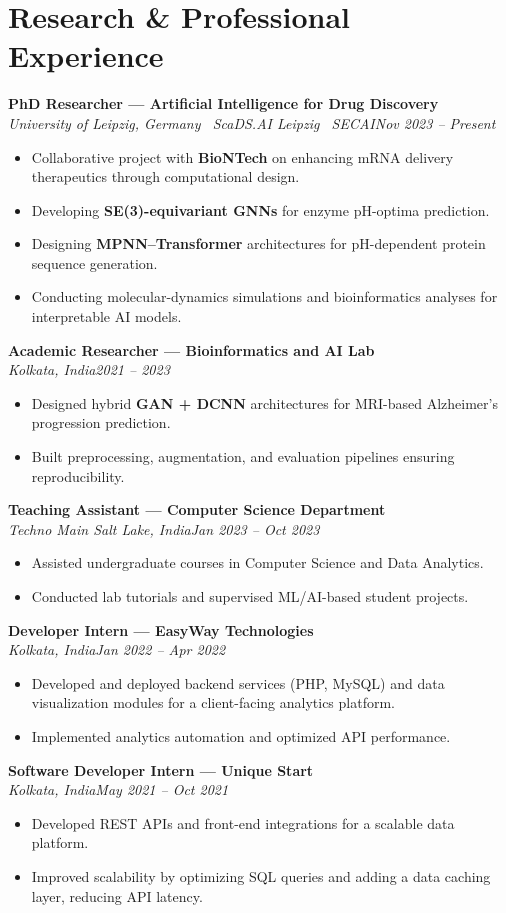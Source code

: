 \documentclass[10pt,a4paper]{article}
\newcommand{\entry}[3]{\textbf{#1}\\\textit{#2}\hfill\textit{#3}\par\vspace{8pt}}
\begin{document}
\section{Research \& Professional Experience}
\entry{PhD Researcher — Artificial Intelligence for Drug Discovery}{University of Leipzig, Germany \textbullet\ ScaDS.AI Leipzig \textbullet\ SECAI}{Nov 2023 – Present}
\begin{itemize}
  \item Collaborative project with \textbf{BioNTech} on enhancing mRNA delivery therapeutics through computational design.
  \item Developing \textbf{SE(3)-equivariant GNNs} for enzyme pH-optima prediction.
  \item Designing \textbf{MPNN–Transformer} architectures for pH-dependent protein sequence generation.
  \item Conducting molecular-dynamics simulations and bioinformatics analyses for interpretable AI models.
\end{itemize}
\vspace{2pt}
\entry{Academic Researcher — Bioinformatics and AI Lab}{Kolkata, India}{2021 – 2023}
\begin{itemize}
  \item Designed hybrid \textbf{GAN + DCNN} architectures for MRI-based Alzheimer’s progression prediction.
  \item Built preprocessing, augmentation, and evaluation pipelines ensuring reproducibility.
\end{itemize}
\vspace{2pt}
\entry{Teaching Assistant — Computer Science Department}{Techno Main Salt Lake, India}{Jan 2023 – Oct 2023}
\begin{itemize}
  \item Assisted undergraduate courses in Computer Science and Data Analytics.
  \item Conducted lab tutorials and supervised ML/AI-based student projects.
\end{itemize}
\vspace{2pt}
\entry{Developer Intern — EasyWay Technologies}{Kolkata, India}{Jan 2022 – Apr 2022}
\begin{itemize}
  \item Developed and deployed backend services (PHP, MySQL) and data visualization modules for a client-facing
        analytics platform.
  \item Implemented analytics automation and optimized API performance.
\end{itemize}
\vspace{2pt}
\entry{Software Developer Intern — Unique Start}{Kolkata, India}{May 2021 – Oct 2021}
\begin{itemize}
  \item Developed REST APIs and front-end integrations for a scalable data platform.
  \item Improved scalability by optimizing SQL queries and adding a data caching layer, reducing API latency.
\end{itemize}
\end{document}
